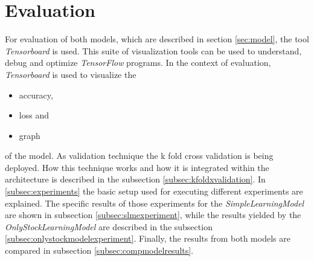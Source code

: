 \section{Evaluation}
\label{sec:evaluation}
For evaluation of both models, which are described in section \ref{sec:model}, the tool \textit{Tensorboard} is used. This suite of visualization tools can be used to understand, debug and optimize \textit{TensorFlow} programs. In the context of evaluation, \textit{Tensorboard} is used to visualize the 
\begin{itemize}
	\item accuracy,
	\item loss and
	\item graph
\end{itemize}
of the model. As validation technique the k fold cross validation is being deployed. How this technique works and how it is integrated within the architecture is described in the subsection \ref{subsec:kfoldxvalidation}. In \ref{subsec:experiments} the basic setup used for executing different experiments are explained. The specific results of those experiments for the \textit{SimpleLearningModel} are shown in subsection \ref{subsec:slmexperiment}, while the results yielded by the \textit{OnlyStockLearningModel} are described in the subsection \ref{subsec:onlystockmodelexperiment}. Finally, the results from both models are compared in subsection \ref{subsec:compmodelresults}.

